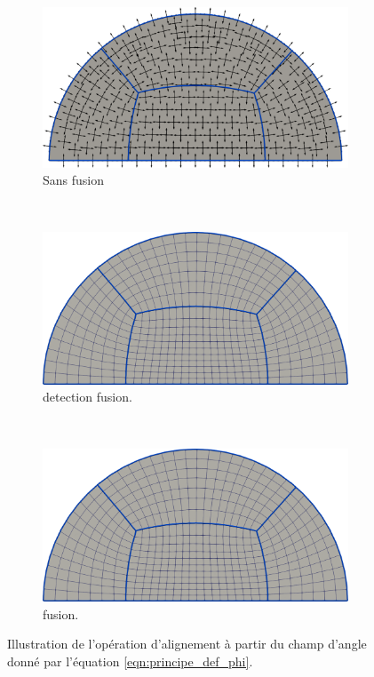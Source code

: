 \begin{figure}[!h]
\centering
\begin{subfigure}{0.65\textwidth}
    \includegraphics[width=\textwidth]{images/demi_disc_second_phi_first.pdf}
    \caption{Sans fusion}
    \label{fig:merge_sepa_first}
\end{subfigure}
\\[0.5cm]
\begin{subfigure}{0.65\textwidth}
    \includegraphics[width=\textwidth]{images/demi_disc_second_phi_second.pdf}
    \caption{detection fusion.}
    \label{fig:merge_sepa_second}
\end{subfigure}        
\\[0.5cm]
\begin{subfigure}{0.65\textwidth}
    \includegraphics[width=\textwidth]{images/demi_disc_second_phi_second.pdf}
    \caption{fusion.}
    \label{fig:merge_sepa_third}
\end{subfigure}        
\caption{Illustration de l'opération d'alignement à partir du champ d'angle donné par l'équation \eqref{eqn:principe_def_phi}.}
\label{fig:merge_sepa}
\end{figure}


